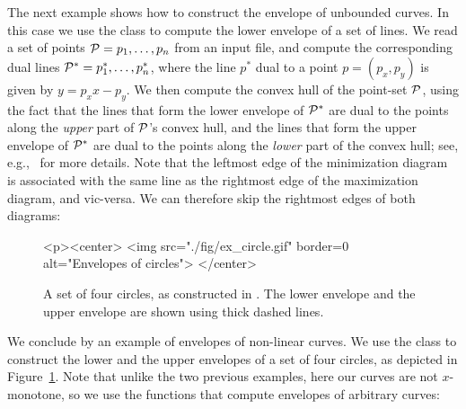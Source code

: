 The next example shows how to construct the envelope of unbounded
curves. In this case we use the  class to
compute the lower envelope of a set of lines. We read a set of
points ${\cal P} = p_1, \ldots, p_n$ from an input file, and compute the
corresponding dual lines ${\cal P}^{*} = p^{*}_1, \ldots, p^{*}_n$, where
the line $p^{*}$ dual to a point $p = (p_x, p_y)$ is given by
$y = p_x x - p_y$. We then compute the convex hull of the point-set
${\cal P}$, using the fact that the lines that form the
lower envelope of ${\cal P}^{*}$ are dual to the points along the
{\em upper} part of ${\cal P}$'s convex hull, and the lines that form the
upper envelope of ${\cal P}^{*}$ are dual to the points along the
{\em lower} part of the convex hull; see,
e.g.,~\cite[Section~11.4]{bkos-cgaa-00} for more details.
Note that the leftmost edge of the minimization diagram is associated
with the same line as the rightmost edge of the maximization diagram,
and vic-versa. We can therefore skip the rightmost edges of both
diagrams:


\begin{figure}[t]
\begin{ccTexOnly}
  \begin{center}
  \end{center}
\end{ccTexOnly}
\begin{ccHtmlOnly}
  <p><center>
  <img src="./fig/ex_circle.gif" border=0 alt="Envelopes of circles">
  </center>
\end{ccHtmlOnly}
\caption{A set of four circles, as constructed in
. The lower envelope and the upper
envelope are shown using thick dashed lines.\label{env2_fig:ex_circ}}
\end{figure}

We conclude by an example of envelopes of non-linear curves. 
We use the  class to construct the
lower and the upper envelopes of a set of four circles, as depicted
in Figure~\ref{env2_fig:ex_circ}. Note that unlike the two previous
examples, here our curves are not $x$-monotone, so we use the functions
that compute envelopes of arbitrary curves:

